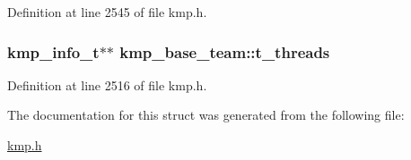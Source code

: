 Definition at line 2545 of file kmp.\-h.

\hypertarget{structkmp__base__team_a6574cfecbdf024b22c209459a8946b5a}{
\subsubsection[{t\-\_\-threads}]{ {\bf kmp\-\_\-info\-\_\-t}$\ast$$\ast$ kmp\-\_\-base\-\_\-team\-::t\-\_\-threads}}\label{structkmp__base__team_a6574cfecbdf024b22c209459a8946b5a}


Definition at line 2516 of file kmp.\-h.



The documentation for this struct was generated from the following file\-:\begin{DoxyCompactItemize}
\item 
\hyperlink{kmp_8h}{kmp.\-h}\end{DoxyCompactItemize}
